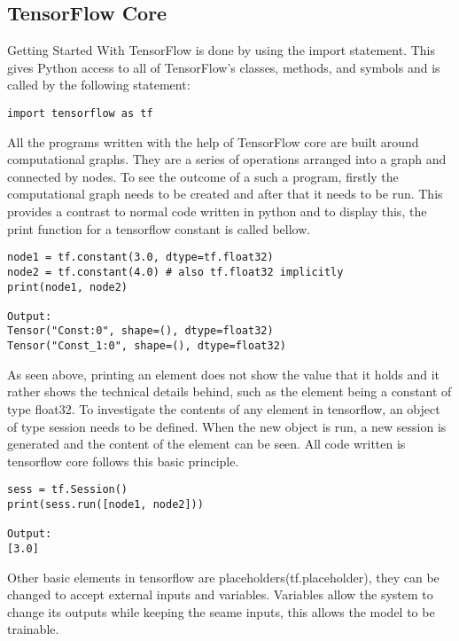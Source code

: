 
\subsection{TensorFlow Core}
Getting Started With TensorFlow is done by using the import statement. 
This gives Python access to all of TensorFlow's classes,
methods, and symbols and is called by the following statement:

\begin{lstlisting}
import tensorflow as tf
\end{lstlisting}

All the programs written with the help of TensorFlow core are built around computational graphs. 
They are a series of operations arranged into a graph and connected by nodes. 
To see the outcome of a such a program, 
firstly the computational graph needs to be created and after that it needs to be run. 
This provides a contrast to normal code written in python and to display this, 
the print function for a tensorflow constant is called bellow.

\begin{lstlisting}
node1 = tf.constant(3.0, dtype=tf.float32)
node2 = tf.constant(4.0) # also tf.float32 implicitly
print(node1, node2)

Output:
Tensor("Const:0", shape=(), dtype=float32)
Tensor("Const_1:0", shape=(), dtype=float32) 
\end{lstlisting}

As seen above, printing an element does not show the value that it holds and it rather shows the technical details behind,
such as the element being a constant of type float32.
To investigate the contents of any element in tensorflow,
an object of type session needs to be defined.
When the new object is run, a new session is generated and the content of the element can be seen.
All code written is tensorflow core follows this basic principle.

\begin{lstlisting}
sess = tf.Session()
print(sess.run([node1, node2]))

Output:
[3.0]
\end{lstlisting}

Other basic elements in tensorflow are placeholders(tf.placeholder), 
they can be changed to accept external inputs and variables.
Variables allow the system to change its outputs while keeping the seame inputs, this allows the model to be trainable. 


